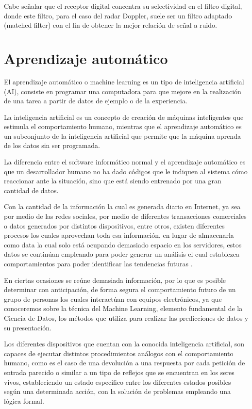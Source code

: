 Cabe señalar que el receptor digital concentra su selectividad en el filtro digital, donde este filtro, para el caso del radar Doppler, suele ser un filtro adaptado (matched filter) con el fin de obtener la mejor relación de señal a ruido.


\section{Aprendizaje automático}

El aprendizaje automático o machine learning es un tipo de inteligencia artificial (AI),
consiste en programar una computadora para que mejore en la realización de una tarea a partir de datos de ejemplo o de la experiencia.

La inteligencia artificial es un concepto de creación de máquinas inteligentes que estimula el comportamiento humano, mientras que el aprendizaje automático es un subconjunto de la inteligencia artificial que permite que la máquina aprenda de los datos sin ser programada.

La diferencia entre el software informático normal y el aprendizaje automático es que un desarrollador humano no ha dado códigos que le indiquen al sistema cómo reaccionar ante la situación, sino que está siendo entrenado por una gran cantidad de datos.

Con la cantidad de la información la cual es generada diario en Internet, ya sea por medio de las redes sociales, por medio de diferentes transacciones comerciales o datos generados por distintos dispositivos, entre otros, existen diferentes procesos los cuales aprovechan toda esa información, en lugar de almacenarla como data la cual solo está ocupando demasiado espacio en los servidores, estos datos se continúan empleando para poder generar un análisis el cual establezca comportamientos para poder identificar las tendencias futuras \cite{Sandoval2018}.

En ciertas ocasiones se reúne demasiada información, por lo que es posible determinar con anticipación, de forma segura el comportamiento futuro de un grupo de personas los cuales interactúan con equipos electrónicos, ya que conoceremos sobre la técnica del Machine Learning, elemento fundamental de la Ciencia de Datos, los métodos que utiliza para realizar las predicciones de datos y su presentación.

Los diferentes dispositivos que cuentan con la conocida inteligencia artificial, son capaces de ejecutar distintos procedimientos análogos con el comportamiento humano, como es el caso de una devolución a una respuesta por cada petición de entrada parecido o similar a un tipo de reflejos que se encuentran en los seres vivos, estableciendo un estado especifico entre los diferentes estados posibles según una determinada acción, con la solución de problemas empleando una lógica formal. 

